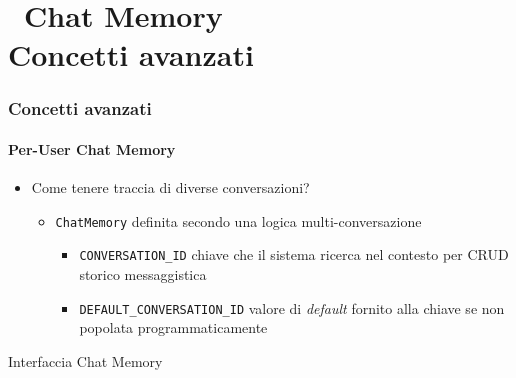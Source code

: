 \section{\faWrench\ Chat Memory\\{\small Concetti avanzati}} %
\label{sec:spring-ai-advanced-chat-memory}
%
\begin{frame}[t,fragile] \frametitle{Concetti avanzati}
    \framesubtitle{Per-User Chat Memory}
    {\footnotesize
    \begin{itemize}[leftmargin=10pt,align=right]
        \item[\alert{\faArrowCircleRight}] Come tenere traccia di diverse conversazioni?
        \begin{itemize}[leftmargin=10pt,align=right]
            \item[\alert{\faArrowCircleRight}] \texttt{ChatMemory} definita secondo una logica \alert{multi-conversazione}
            \begin{itemize}[leftmargin=10pt,align=right]
                \item[\alert{\faExclamationTriangle}] \alert{\texttt{CONVERSATION\_ID}} chiave che il sistema ricerca nel contesto per CRUD storico messaggistica
                \item[\alert{\faExclamationTriangle}] \alert{\texttt{DEFAULT\_CONVERSATION\_ID}} valore di \textit{default} fornito alla chiave se non popolata programmaticamente
            \end{itemize}
        \end{itemize}
    \end{itemize}
    }
    \begin{block}{Interfaccia Chat Memory}
		{\tiny\inputminted{java}{code/ChatMemory.java}}
    \end{block}
\end{frame}    
%
